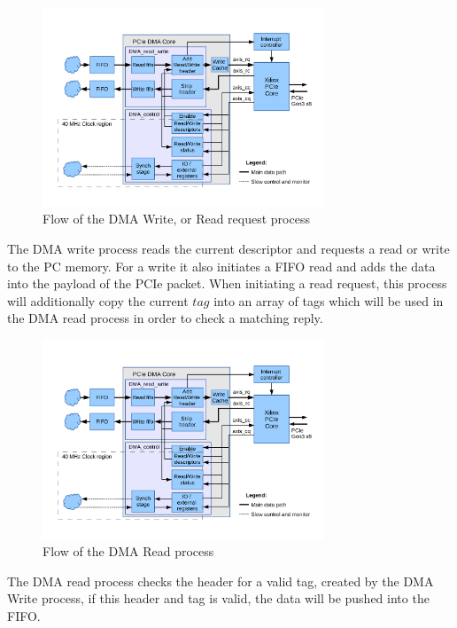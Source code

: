 \begin{figure}[H]
\centering
\includegraphics[trim=0mm 1cm 0mm 0cm, width=0.75\textwidth, page=3]{pictures/dma_core_structure.pdf}
\caption{Flow of the DMA Write, or Read request process}
\label{fig:flowdma_write}
\end{figure}
The DMA write process reads the current descriptor and requests a read or write to the PC memory. For a write it also initiates a FIFO read and adds the data into the payload of the PCIe packet. When initiating a read request, this process will additionally copy the current $tag$ into an array of tags which will be used in the DMA read process in order to check a matching reply. 
\begin{figure}[H]
\centering
\includegraphics[trim=0mm 3cm 0mm 1cm, width=0.75\textwidth, page=4]{pictures/dma_core_structure.pdf}
\caption{Flow of the DMA Read process}
\label{fig:flow_dma_read}
\end{figure}
The DMA read process checks the header for a valid tag, created by the DMA Write process, if this header and tag is valid, the data will be pushed into the FIFO.
